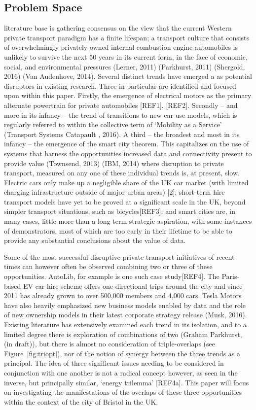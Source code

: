 \documentclass[journal]{IEEEtran}
\begin{document}
\subsection{Problem Space}

 literature base is gathering consensus on
the view that the current Western private transport paradigm has a
finite lifespan; a transport culture that consists of overwhelmingly
privately-owned internal combustion engine automobiles is unlikely to
survive the next 50 years in its current form, in the face of
economic, social, and environmental pressures (Lerner, 2011)
(Parkhurst, 2011) (Shergold, 2016) (Van Audenhove, 2014).  Several
distinct trends have emerged a as potential disruptors in existing
research. Three in particular are identified and focused upon within
this paper.  Firstly, the emergence of electrical motors as the
primary alternate powertrain for private automobiles [REF1]. [REF2].
Secondly -- and more in its infancy -- the trend of transitions to new
car use models, which is regularly referred to within the collective
term of `Mobility as a Service' (Transport Systems Catapault , 2016).
A third -- the broadest and most in its infancy -- the emergence of
the smart city theorem. This capitalizes on the use of systems that
harness the opportunities increased data and connectivity present to
provide value (Townsend, 2013) (IBM, 2014) where disruption to private
transport, measured on any one of these individual trends is, at
present, slow. Electric cars only make up a negligible share of the UK
car market (with limited charging infrastructure outside of major
urban areas) [2]; short-term hire transport models have yet to be
proved at a significant scale in the UK, beyond simpler transport
situations, such as bicycles[REF3]; and smart cities are, in many
cases, little more than a long term strategic aspiration, with some
instances of demonstrators, most of which are too early in their
lifetime to be able to provide any substantial conclusions about the
value of data.

Some of the most successful disruptive private transport initiatives
of recent times can however often be observed combining two or three
of these opportunities. AutoLib, for example is one such case
study[REF4]. The Paris-based EV car hire scheme offers one-directional
trips around the city and since 2011 has already grown to over 500,000
members and 4,000 cars. Tesla Motors have also heavily emphasized new
business models enabled by data and the role of new ownership models
in their latest corporate strategy release (Musk, 2016). Existing
literature has extensively examined each trend in its isolation, and
to a limited degree there is exploration of combinations of two
(Graham Parkhurst, (in draft)), but there is almost no consideration
of triple-overlaps (see Figure~\ref{fig:triopt}), nor of the notion of
synergy between the three trends as a principal. The idea of three
significant issues needing to be considered in conjunction with one
another is not a radical concept however, as seen in the inverse, but
principally similar, `energy trilemma' [REF4a].  This paper will focus
on investigating the manifestations of the overlaps of these three
opportunities within the context of the city of Bristol in the UK.
\end{document}
